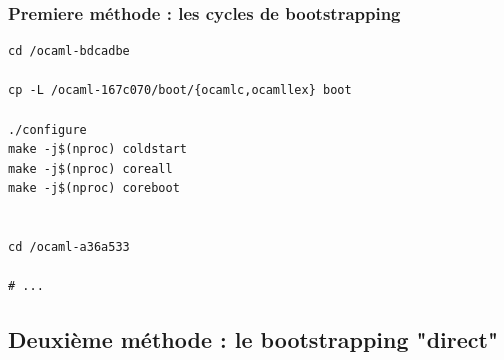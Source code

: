 \begin{frame}[fragile]
    \frametitle{Premiere méthode : les cycles de bootstrapping\esp}

    \begin{verbatim}
cd /ocaml-bdcadbe

cp -L /ocaml-167c070/boot/{ocamlc,ocamllex} boot

./configure
make -j$(nproc) coldstart
make -j$(nproc) coreall
make -j$(nproc) coreboot


cd /ocaml-a36a533

# ...
    \end{verbatim}
\end{frame}

\subsection{Deuxième méthode : le bootstrapping "direct"}
